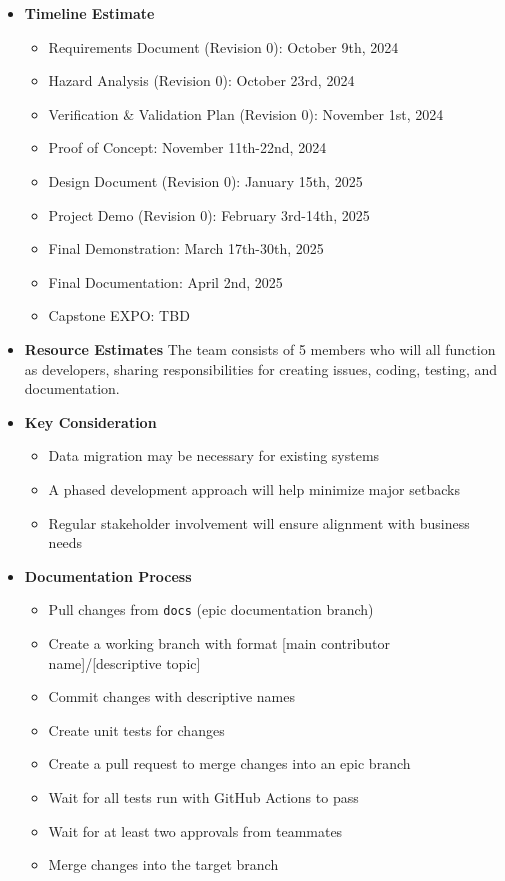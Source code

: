 \documentclass[12pt]{article}
\begin{document}
\begin{itemize}
\begin{itemize}
    \end{itemize}
  \item \textbf{Timeline Estimate}
    \begin{itemize}
      \item Requirements Document (Revision 0): October 9th, 2024
      \item Hazard Analysis (Revision 0): October 23rd, 2024
      \item Verification \& Validation Plan (Revision 0): November 1st, 2024
      \item Proof of Concept: November 11th-22nd, 2024
      \item Design Document (Revision 0): January 15th, 2025
      \item Project Demo (Revision 0): February 3rd-14th, 2025
      \item Final Demonstration: March 17th-30th, 2025
      \item Final Documentation: April 2nd, 2025
      \item Capstone EXPO: TBD
    \end{itemize}

  \item \textbf{Resource Estimates}
    The team consists of 5 members who will all function as
    developers, sharing responsibilities for creating issues, coding,
    testing, and documentation.

  \item \textbf{Key Consideration}
    \begin{itemize}
      \item Data migration may be necessary for existing systems
      \item A phased development approach will help minimize major setbacks
      \item Regular stakeholder involvement will ensure alignment
        with business needs
    \end{itemize}

  \item \textbf{Documentation Process}
    \begin{itemize}
      \item Pull changes from \texttt{docs} (epic documentation branch)
      \item Create a working branch with format [main contributor
        name]/[descriptive topic]
      \item Commit changes with descriptive names
      \item Create unit tests for changes
      \item Create a pull request to merge changes into an epic branch
      \item Wait for all tests run with GitHub Actions to pass
      \item Wait for at least two approvals from teammates
      \item Merge changes into the target branch
    \end{itemize}

\end{itemize}
\end{document}
